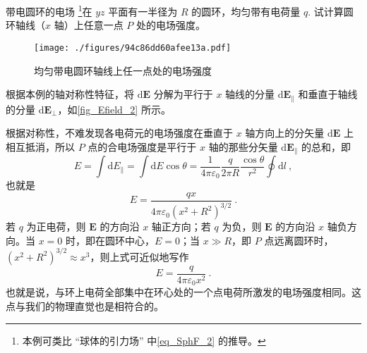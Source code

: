 \begin{example}{带电圆环的电场}\label{ex_Efield_2}
\footnote{本例可类比 “球体的引力场” 中\autoref{eq_SphF_2} 的推导。}在 $yz$ 平面有一半径为 $R$ 的圆环，均匀带有电荷量 $q$. 试计算圆环轴线（$x$ 轴）上任意一点 $P$ 处的电场强度。
\begin{figure}[ht]
\centering
\texttt{[image: ./figures/94c86dd60afee13a.pdf]}
\caption{均匀带电圆环轴线上任一点处的电场强度} \label{fig_Efield_2}
\end{figure}

根据本例的轴对称性特征，将 $\mathrm d\mathbf E$ 分解为平行于 $x$ 轴线的分量 $\mathrm d\mathbf E_\parallel$ 和垂直于轴线的分量 $\mathrm d\mathbf E_\perp$，如\autoref{fig_Efield_2} 所示。

根据对称性，不难发现各电荷元的电场强度在垂直于 $x$ 轴方向上的分矢量 $\mathrm d\mathbf E$ 上相互抵消，所以 $P$ 点的合电场强度是平行于 $x$ 轴的那些分矢量 $\mathrm d\mathbf E_\parallel$ 的总和，即
\begin{equation}
E=\int \mathrm{d} E_\parallel=\int \mathrm{d} E \cos \theta=\frac{1}{4 \pi \varepsilon_{0}} \frac{q}{2 \pi R} \frac{\cos \theta}{r^{2}} \oint \mathrm{d} l~,
\end{equation}
也就是
\begin{equation} \label{eq_Efield_6}
E=\frac{q x}{4 \pi \varepsilon_{0}\left(x^{2}+R^{2}\right)^{3 / 2}} ~.
\end{equation}
若 $q$ 为正电荷，则 $\mathbf E$ 的方向沿 $x$ 轴正方向；若 $q$ 为负，则 $\mathbf E$ 的方向沿 $x$ 轴负方向。当 $x=0$ 时，即在圆环中心，$E=0$；当 $x\gg R$，即 $P$ 点远离圆环时，$\left(x^{2}+R^{2}\right)^{3 / 2} \approx x^{3}$，则上式可近似地写作
\begin{equation}
E=\frac{q}{4 \pi \varepsilon_{0} x^{2}}~.
\end{equation}
也就是说，与环上电荷全部集中在环心处的一个点电荷所激发的电场强度相同。这点与我们的物理直觉也是相符合的。
\end{example}

